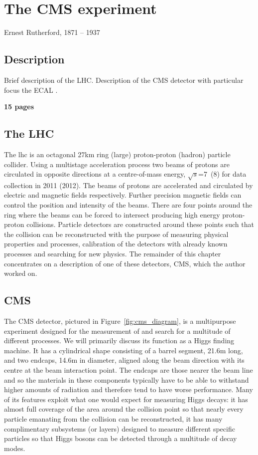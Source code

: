 \chapter{The CMS experiment}
\label{chap:cms}
{Ernest Rutherford, 1871 -- 1937}

\section{Description}

Brief description of the LHC. Description of the CMS detector with particular focus the ECAL .

\textbf{15 pages}

\section{The LHC}

The \acf{lhc} is an octagonal 27km ring (large) proton-proton (hadron) particle collider. Using a multistage acceleration process two beams of protons are circulated in opposite directions at a centre-of-mass energy, $\sqrt{s}$=7\TeV~(8\TeV) for data collection in 2011 (2012). The beams of protons are accelerated and circulated by electric and magnetic fields respectively. Further precision magnetic fields can control the position and intensity of the beams. There are four points around the ring where the beams can be forced to intersect producing high energy proton-proton collisions. Particle detectors are constructed around these points such that the collision can be reconstructed with the purpose of measuring physical properties and processes, calibration of the detectors with already known processes and searching for new physics. The remainder of this chapter concentrates on a description of one of these detectors, CMS, which the author worked on.

\section{CMS}

The \acf{CMS} detector, pictured in Figure~\ref{fig:cms_diagram}, is a multipurpose experiment designed for the measurement of and search for a multitude of different processes. We will primarily discuss its function as a Higgs finding machine. It has a cylindrical shape consisting of a barrel segment, 21.6m long, and two endcaps, 14.6m in diameter, aligned along the beam direction with its centre at the beam interaction point. The endcaps are those nearer the beam line and so the materials in these components typically have to be able to withstand higher amounts of radiation and therefore tend to have worse performance. Many of its features exploit what one would expect for measuring Higgs decays: it has almost full coverage of the area around the collision point so that nearly every particle emanating from the collision can be reconstructed, it has many complimentary subsystems (or layers) designed to measure different specific particles so that Higgs bosons can be detected through a multitude of decay modes. 

